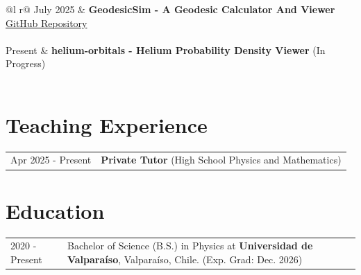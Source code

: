\documentclass[a4paper,12pt]{article}
\begin{document}
\begin{tabularx}{\linewidth}{ @{}l r@{} }
July 2025 & \textbf{GeodesicSim - A Geodesic Calculator And Viewer} \hfill \href{https://github.com/jovajara/GeodesicSim}{GitHub Repository} \\[3.75pt]
 \vspace{4mm}\\

Present & \textbf{helium-orbitals - Helium Probability Density Viewer} \hfill (In Progress) \\[3.75pt]
 \\
\end{tabularx}

\section{Teaching Experience}
\begin{tabularx}{\linewidth}{@{}l X@{}}
Apr 2025 - Present & \textbf{Private Tutor} (High School Physics and Mathematics) \\ 
\end{tabularx}

\section{Education}
\begin{tabularx}{\linewidth}{@{}l X@{}}	
2020 - Present & Bachelor of Science (B.S.) in Physics at \textbf{Universidad de Valparaíso}, Valparaíso, Chile. \hfill \normalsize (Exp. Grad: Dec. 2026) \\
\end{tabularx}
\end{document}

